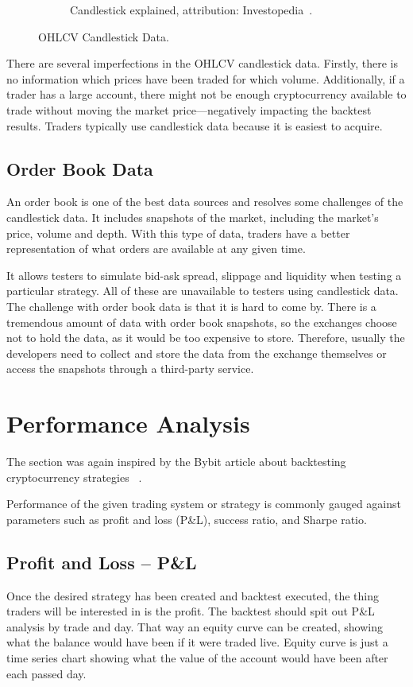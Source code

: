\begin{figure}
\begin{subfigure}[t]{0.45\textwidth}
        \caption{Candlestick explained, attribution: Investopedia~\cite{investopedia:candlestick-charts}.}
        \label{candlestick-figure}
    \end{subfigure}
    \caption{OHLCV Candlestick Data.}
\end{figure}

There are several imperfections in the OHLCV candlestick data. Firstly, there is no information which prices have been traded for which volume. Additionally, if a trader has a large account, there might not be enough cryptocurrency available to trade without moving the market price---negatively impacting the backtest results. Traders typically use candlestick data because it is easiest to acquire.

\subsection*{Order Book Data}
An order book is one of the best data sources and resolves some challenges of the candlestick data. It includes snapshots of the market, including the market's price, volume and depth. With this type of data, traders have a better representation of what orders are available at any given time.

It allows testers to simulate bid-ask spread, slippage and liquidity when testing a particular strategy. All of these are unavailable to testers using candlestick data. The challenge with order book data is that it is hard to come by. There is a tremendous amount of data with order book snapshots, so the exchanges choose not to hold the data, as it would be too expensive to store. Therefore, usually the developers need to collect and store the data from the exchange themselves or access the snapshots through a third-party service.

\section{Performance Analysis}
\label{performance-analysis}
The section was again inspired by the Bybit article about backtesting cryptocurrency strategies ~\cite{backtesting-crypto-trading-strategies}.

Performance of the given trading system or strategy is commonly gauged against parameters such as profit and loss (P\&L), success ratio, and Sharpe ratio.

\subsection*{Profit and Loss -- P\&L}
Once the desired strategy has been created and backtest executed, the thing traders will be interested in is the profit. The backtest should spit out P\&L analysis by trade and day. That way an equity curve can be created, showing what the balance would have been if it were traded live. Equity curve is just a time series chart showing what the value of the account would have been after each passed day.

